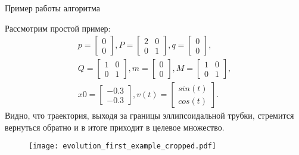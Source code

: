 \documentclass{beamer}
\begin{document}
\begin{frame}{Пример работы алгоритма}
  \begin{minipage}{0.45\textwidth}
    Рассмотрим простой пример:
    \begin{gather*}
        p = \begin{bmatrix}
                0 \\[0.3em]
                0
            \end{bmatrix},
        P = \begin{bmatrix}
                2 & 0 \\[0.3em]
                0 & 1
            \end{bmatrix},
        q = \begin{bmatrix}
                0 \\[0.3em]
                0
            \end{bmatrix}, \\
        Q = \begin{bmatrix}
                1 & 0 \\[0.3em]
                0 & 1
            \end{bmatrix},
        m = \begin{bmatrix}
                0 \\[0.3em]
                0
            \end{bmatrix},
        M = \begin{bmatrix}
                1 & 0 \\[0.3em]
                0 & 1
            \end{bmatrix}, \\
        x0 = \begin{bmatrix}
                -0.3 \\[0.3em]
                -0.3
            \end{bmatrix}, 
        v(t) = \begin{bmatrix}
                sin(t) \\[0.3em]
                cos(t)
            \end{bmatrix}.
    \end{gather*}
    Видно, что траектория, выходя за границы эллипсоидальной трубки, стремится вернуться обратно и в итоге приходит в целевое множество.
  \end{minipage} \hfill
  \begin{minipage}{0.5\textwidth}
      \begin{figure}
        \texttt{[image: evolution\_first\_example\_cropped.pdf]}
      \end{figure}
  \end{minipage}
  
\end{frame}
\end{document}
